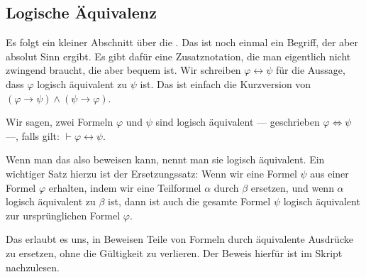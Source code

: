 \subsection{Logische Äquivalenz}

\begin{spoken-clean}[01:07:47 - 01:09:47]
Es folgt ein kleiner Abschnitt über die . Das ist noch einmal ein Begriff, der aber absolut Sinn ergibt. Es gibt dafür eine Zusatznotation, die man eigentlich nicht zwingend braucht, die aber bequem ist. Wir schreiben $\varphi \leftrightarrow \psi$ für die Aussage, dass $\varphi$ logisch äquivalent zu $\psi$ ist. Das ist einfach die Kurzversion von $(\varphi \to \psi) \land (\psi \to \varphi)$.

Wir sagen, zwei Formeln $\varphi$ und $\psi$ sind logisch äquivalent --- geschrieben $\varphi \Leftrightarrow \psi$ ---, falls gilt: $\vdash \varphi \leftrightarrow \psi$.
\end{spoken-clean}

\begin{math-stroke}
\end{math-stroke}

\begin{spoken-clean}[01:09:47 - 01:11:42]
Wenn man das also beweisen kann, nennt man sie logisch äquivalent. Ein wichtiger Satz hierzu ist der Ersetzungssatz: Wenn wir eine Formel $\psi$ aus einer Formel $\varphi$ erhalten, indem wir eine Teilformel $\alpha$ durch $\beta$ ersetzen, und wenn $\alpha$ logisch äquivalent zu $\beta$ ist, dann ist auch die gesamte Formel $\psi$ logisch äquivalent zur ursprünglichen Formel $\varphi$.

Das erlaubt es uns, in Beweisen Teile von Formeln durch äquivalente Ausdrücke zu ersetzen, ohne die Gültigkeit zu verlieren. Der Beweis hierfür ist im Skript nachzulesen.
\end{spoken-clean}

